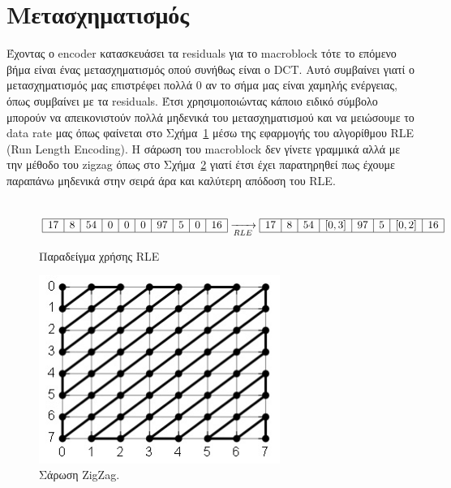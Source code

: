 \newpage

\section{Μετασχηματισμός}
\label{section:sect24}

\indent Έχοντας ο encoder κατασκευάσει τα residuals για το macroblock τότε το επόμενο βήμα είναι ένας μετασχηματισμός οπού συνήθως είναι ο DCT. Αυτό συμβαίνει γιατί ο μετασχηματισμός μας επιστρέφει πολλά 0 αν το σήμα μας είναι χαμηλής ενέργειας, όπως συμβαίνει με τα residuals. Έτσι χρησιμοποιώντας κάποιο ειδικό σύμβολο μπορούν να απεικονιστούν πολλά μηδενικά του μετασχηματισμού και να μειώσουμε το data rate μας όπως φαίνεται στο Σχήμα~\ref{eq:rle} μέσω της εφαρμογής του αλγορίθμου RLE (Run Length Encoding). Η σάρωση του macroblock δεν γίνετε γραμμικά αλλά με την μέθοδο του zigzag όπως στο Σχήμα~\ref{fig:zigzag} γιατί έτσι έχει παρατηρηθεί πως έχουμε παραπάνω μηδενικά στην σειρά άρα και καλύτερη απόδοση του RLE.
\\
\\
\begin{figure}[H]
\centering
$
\begin{array}{| c | c | c | c | c | c | c | c | c | c |}
    \hline 17 & 8 & 54 & 0 & 0 & 0 & 97 & 5 & 0 & 16 \\ \hline
\end{array}
\xrightarrow[RLE]{}
\begin{array}{| c | c | c | c | c | c | c | c |}
    \hline 17 & 8 & 54 & [0,3]  & 97 & 5 & [0,2] & 16 \\ \hline
\end{array}
$
\caption{Παραδείγμα χρήσης RLE}
\label{eq:rle}
\end{figure}

\begin{figure}[H]
  \centering
  \includegraphics[width=0.7\textwidth]{chapter2/zigzag.jpg}
  \caption{Σάρωση ZigZag. \cite{misc:zigzag}}
  \label{fig:zigzag}
\end{figure}

